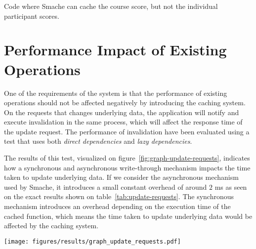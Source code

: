 \begin{code}{Code where Smache can cache the course score, but not the individual participant scores.}
  
  \label{code:running-example-non-cachable}
\end{code}


\section{Performance Impact of Existing Operations}
\label{sec:performance-impact-of-existing-procedures}

One of the requirements of the system is that the performance of existing operations should not be affected negatively by introducing the caching system. On the requests that changes underlying data, the application will notify and execute invalidation in the same process, which will affect the response time of the update request. The performance of invalidation have been evaluated using a test that uses both \emph{direct dependencies} and \emph{lazy dependencies}.

The results of this test, visualized on figure~\ref{fig:graph-update-requests}, indicates how a synchronous and asynchronous write-through mechanism impacts the time taken to update underlying data. If we consider the asynchronous mechanism used by Smache, it introduces a small constant overhead of around $2$ ms as seen on the exact results shown on table~\ref{tab:update-requests}. The synchronous mechanism introduces an overhead depending on the execution time of the cached function, which means the time taken to update underlying data would be affected by the caching system.

\begin{figure*}[ht!]
  \centering
  \texttt{[image: figures/results/graph\_update\_requests.pdf]}
  \caption{Impact of introducing synchronous and asynchronous write-through in a case, where the update affects a single cached object instance with variable execution time.}
  \label{fig:graph-update-requests}
\end{figure*}

